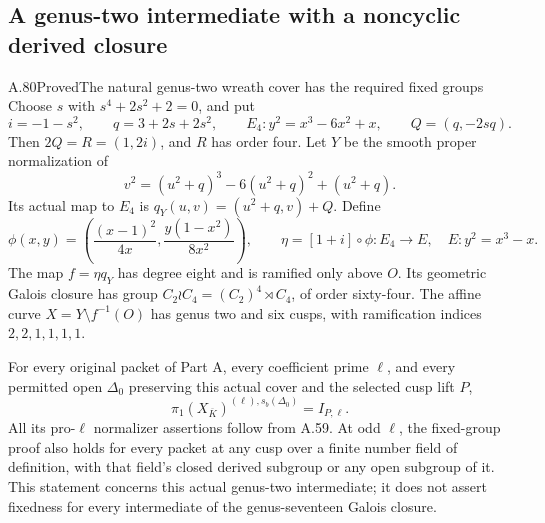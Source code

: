 \subsection{A genus-two intermediate with a noncyclic derived closure}

\begin{statement}{A.80}{Proved}{The natural genus-two wreath cover has the required fixed groups}
Choose \(s\) with \(s^4+2s^2+2=0\), and put
\[
 i=-1-s^2,\qquad q=3+2s+2s^2,\qquad
 E_4:y^2=x^3-6x^2+x,\qquad Q=(q,-2sq).
                                                        \tag{A.80.1}
\]
Then \(2Q=R=(1,2i)\), and \(R\) has order four.
Let \(Y\) be the smooth proper normalization of
\[
 v^2=(u^2+q)^3-6(u^2+q)^2+(u^2+q).
                                                        \tag{A.80.2}
\]
Its actual map to \(E_4\) is
\(q_Y(u,v)=(u^2+q,v)+Q\). Define
\[
 \phi(x,y)=\left(\frac{(x-1)^2}{4x},
                  \frac{y(1-x^2)}{8x^2}\right),\qquad
 \eta=[1+i]\circ\phi:E_4\longrightarrow E,
 \quad E:y^2=x^3-x.
                                                        \tag{A.80.3}
\]
The map \(f=\eta q_Y\) has degree eight and is ramified only
above \(O\). Its geometric Galois closure has group
\(C_2\wr C_4=(C_2)^4\rtimes C_4\), of order sixty-four.
The affine curve \(X=Y\setminus f^{-1}(O)\) has genus two
and six cusps, with ramification indices \(2,2,1,1,1,1\).

For every original packet of Part A, every coefficient prime
\(\ell\), and every permitted open \(\Delta_0\) preserving
this actual cover and the selected cusp lift \(P\),
\[
       \pi_1(X_{\overline K})^{(\ell),s_b(\Delta_0)}
                              =I_{P,\ell}.              \tag{A.80.4}
\]
All its pro-\(\ell\) normalizer assertions follow from A.59.
At odd \(\ell\), the fixed-group proof also holds for every
packet at any cusp over a finite number field of definition,
with that field's closed derived subgroup or any open subgroup
of it. This statement concerns this actual genus-two intermediate;
it does not assert fixedness for every intermediate of the
genus-seventeen Galois closure.
\end{statement}

